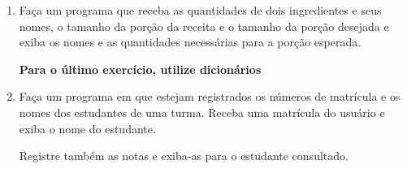 \begin{enumerate}
	\begin{multicols}{2}				
		\begin{equation*}
			v_1 = \frac{c_1}{T_v} 100\% 
		\end{equation*}
	
		\begin{equation*}
			v_2 = \frac{c_2}{T_v} 100\% 
		\end{equation*}
	\end{multicols}
	
	\item Faça um programa que receba as quantidades de dois ingredientes e seus nomes, o tamanho da porção da receita e o tamanho da porção desejada e exiba os nomes e as quantidades necessárias para a porção esperada.

	\textbf{Para o último exercício, utilize dicionários}

	\item Faça um programa em que estejam registrados os números de matrícula e os nomes dos estudantes de uma turma. 
	Receba uma matrícula do usuário e exiba o nome do estudante.
	
	Registre também as notas e exiba-as para o estudante consultado.

 

	

	
\end{enumerate}